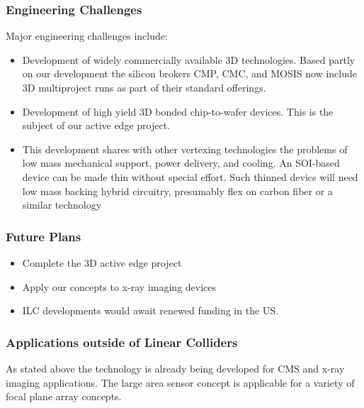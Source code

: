 \subsubsection{Engineering Challenges}
Major  engineering challenges include:
\begin{itemize}
\item Development of widely commercially available 3D technologies.  Based partly on our development the silicon brokers CMP, CMC, and MOSIS now include 3D multiproject runs as part of their standard offerings.
\item Development of high yield 3D bonded chip-to-wafer devices.  This is the subject of our active edge project.
\item This development shares with other vertexing technologies the problems of low mass mechanical support, power delivery, and cooling. An SOI-based device can be made thin without special effort. Such thinned devics will need low mass backing hybrid circuitry, presumably flex on carbon fiber or a similar technology
\end{itemize}

\subsubsection{Future Plans}
\begin{itemize}
\item Complete the 3D active edge project
\item Apply our concepts to x-ray imaging devices
\item ILC developments would await renewed funding in the US.
\end{itemize}

\subsubsection{Applications outside of Linear Colliders}
As stated above the technology is already being developed for CMS and x-ray imaging applications.  The large area sensor concept is applicable for a variety of focal plane array concepts.

